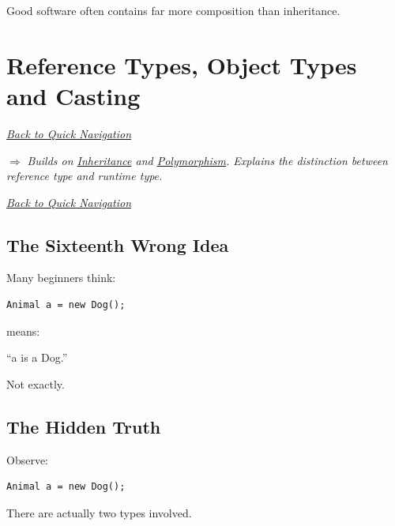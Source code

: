\documentclass[11pt,a4paper]{book}
\begin{document}
Good software often contains
far more composition
than inheritance.

\chapter{Reference Types, Object Types and Casting}\label{chap:casting}

\smallskip
\noindent
\hyperref[sec:quick_nav]{\emph{Back to Quick Navigation}}

\smallskip
\noindent
\textcolor{RosettaRoyalPurple}{$\Rightarrow$}
\emph{Builds on \hyperref[chap:inheritance]{Inheritance} and \hyperref[chap:polymorphism]{Polymorphism}. Explains the distinction between reference type and runtime type.}

\smallskip
\noindent
\hyperref[sec:quick_nav]{\emph{Back to Quick Navigation}}


\section{The Sixteenth Wrong Idea}

\begin{trap}

Many beginners think:

\begin{verbatim}
Animal a = new Dog();
\end{verbatim}

means:

``a is a Dog.''

Not exactly.

\end{trap}


\section{The Hidden Truth}

Observe:

\begin{verbatim}
Animal a = new Dog();
\end{verbatim}

There are actually two types involved.

\end{document}
